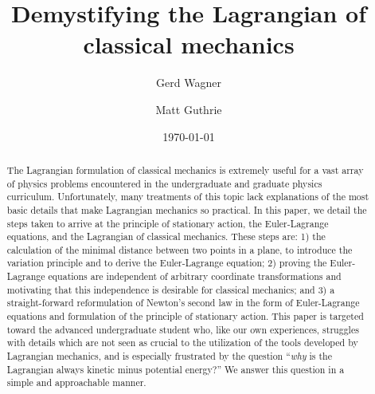 \documentclass[prb,preprint]{revtex4-1}
\begin{document}

\title{Demystifying the Lagrangian of classical mechanics} %

\author{Gerd Wagner}

\author{Matt Guthrie}


\date{\today}

\begin{abstract} 
The Lagrangian formulation of classical mechanics is extremely useful for a vast array of physics problems encountered in the undergraduate and graduate physics curriculum. Unfortunately, many treatments of this topic lack explanations of the most basic details that make Lagrangian mechanics so practical. In this paper, we detail the steps taken to arrive at the principle of stationary action, the Euler-Lagrange equations, and the Lagrangian of classical mechanics. These steps are: 1) the calculation of the minimal distance between two points in a plane, to introduce the variation principle and to derive the Euler-Lagrange equation; 2) proving the Euler-Lagrange equations are independent of arbitrary coordinate transformations and motivating that this independence is desirable for classical mechanics; and 3) a straight-forward reformulation of Newton's second law in the form of Euler-Lagrange equations and formulation of the principle of stationary action. This paper is targeted toward the advanced undergraduate student who, like our own experiences, struggles with details which are not seen as crucial to the utilization of the tools developed by Lagrangian mechanics, and is especially frustrated by the question ``\textit{why} is the Lagrangian always kinetic minus potential energy?'' We answer this question in a simple and approachable manner.
\end{abstract}  
\end{document}
